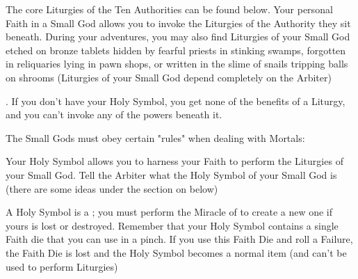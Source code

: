

The core Liturgies of the Ten Authorities can be found below.  Your personal Faith in a Small God allows you to invoke the Liturgies of the Authority they sit beneath. During your adventures, you may also find Liturgies of your Small God etched on bronze tablets hidden by fearful priests in stinking swamps, forgotten in reliquaries lying in pawn shops, or written in the slime of snails tripping balls on shrooms (Liturgies of your Small God depend completely on the Arbiter)

.  If you don't have your Holy Symbol, you get none of the benefits of a Liturgy, and you can't invoke any of the powers beneath it.





The Small Gods must obey certain "rules" when dealing with Mortals:



Your Holy Symbol allows you to harness your Faith to perform the Liturgies of your Small God.  Tell the Arbiter what the Holy Symbol of your Small God is (there are some ideas under the section on  below)

A Holy Symbol is a ; you must perform the Miracle of  to create a new one if yours is lost or destroyed.  Remember that your Holy Symbol contains a single Faith die that you can use in a pinch.  If you use this Faith Die and roll a Failure, the Faith Die is lost and the Holy Symbol becomes a normal item (and can't be used to perform Liturgies)

